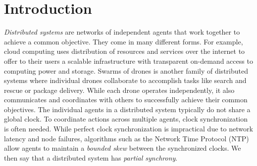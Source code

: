 \section{Introduction} 
\label{sec:introduction}

\emph{Distributed systems} are networks of independent agents that work together to achieve a 
common objective.
%
They come in many different forms.
%
For example, cloud computing uses distribution of resources and services over the internet to offer 
to their users a scalable infrastructure with transparent on-demand access to computing power and 
storage. 
%
Swarms of drones is another family of distributed systems where individual drones 
collaborate to accomplish tasks like search and rescue or package delivery.
%
While each drone operates independently, it also communicates and coordinates with others to 
successfully achieve their common objectives.
%
The individual agents in a distributed system typically do not share a global clock.
%
To coordinate actions across multiple agents, clock synchronization is often needed.
%
While perfect clock synchronization is impractical due to network latency and node failures, 
algorithms such as the Network Time Protocol (NTP) allow agents to maintain a \emph{bounded 
skew} between the synchronized clocks.
%
We then say that a distributed system has \emph{partial synchrony}. 


